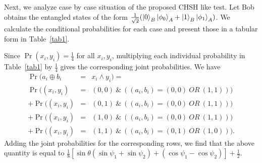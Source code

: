 \documentclass[twocolumn,pra,aps,amssymb]{revtex4}
\begin{document}
Next, we analyze case by case situation of the proposed CHSH like test. Let Bob obtains the entangled states of the form $\frac{1}{\sqrt{2}}(\left|0\right\rangle_{B}\left|\phi_0\right\rangle_{A}+\left|1\right\rangle_{B}\left|\phi_1\right\rangle_{A})$. We calculate the conditional probabilities for each case and present those in a tabular form in Table~\ref{tab1}.

Since $\Pr(x_i,y_i) = \frac{1}{4}$ for all $x_i, y_i$, 
multiplying each individual probability in Table~\ref{tab1} by
$\frac{1}{4}$ gives the corresponding joint probabilities.
We have 
{\scriptsize
\begin{eqnarray*}
\Pr(a_i \oplus b_i &=& x_i \wedge y_i) =\\
  \Pr((x_i,y_i) &=& (0,0) \ \& \ ((a_i,b_i) = (0,0) \ OR \ (1,1)))\\
 + \Pr((x_i,y_i) &=& (0,1) \ \& \ ((a_i,b_i) = (0,0) \ OR \ (1,1))) \\
+ \Pr((x_i,y_i) &=& (1,0) \ \& \ ((a_i,b_i) = (0,0) \ OR \ (1,1)))\\
+ \Pr((x_i,y_i) &=& (1,1) \ \& \ ((a_i,b_i) = (0,1) \ OR \ (1,0))).
\end{eqnarray*}}
Adding the joint probabilities for the corresponding rows,
we find that the above quantity is equal to $\frac{1}{8}[\sin \theta (\sin \psi_{1} +\sin \psi_{2} )+(\cos \psi_{1}-\cos \psi_{2})]+\frac{1}{2}$.
\end{document}
